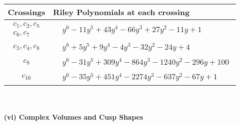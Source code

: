 \documentclass[1p]{elsarticle_modified}
\theoremstyle{definition}
\begin{document}
\begin{tabular}{m{50pt}|m{274pt}}
Crossings & \hspace{64pt}Riley Polynomials at each crossing \\
\hline $$\begin{aligned}c_{1},c_{2},c_{5}\\c_{6},c_{7}\end{aligned}$$&$\begin{aligned}
&y^6-11 y^5+43 y^4-66 y^3+27 y^2-11 y+1
\end{aligned}$\\
\hline $$\begin{aligned}c_{3},c_{4},c_{8}\end{aligned}$$&$\begin{aligned}
&y^6+5 y^5+9 y^4-4 y^3-32 y^2-24 y+4
\end{aligned}$\\
\hline $$\begin{aligned}c_{9}\end{aligned}$$&$\begin{aligned}
&y^6-31 y^5+309 y^4-864 y^3-1240 y^2-296 y+100
\end{aligned}$\\
\hline $$\begin{aligned}c_{10}\end{aligned}$$&$\begin{aligned}
&y^6-35 y^5+451 y^4-2274 y^3-637 y^2-67 y+1
\end{aligned}$\\
\hline
\end{tabular}\\~\\
\newpage\flushleft \textbf{(vi) Complex Volumes and Cusp Shapes}
\end{document}
